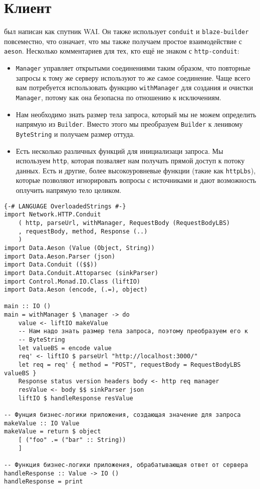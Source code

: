 \section {Клиент}

 был написан как спутник WAI. Он также использует \lstinline!conduit! и \lstinline!blaze-builder! повсеместно, что означает, что мы также получаем простое взаимодействие с \lstinline!aeson!. Несколько комментариев для тех, кто ещё не знаком с \lstinline!http-conduit!:

\begin{itemize}
  \item \lstinline!Manager! управляет открытыми соединениями таким образом, что повторные запросы к тому же серверу используют то же самое соединение. Чаще всего вам потребуется использовать функцию \lstinline!withManager! для создания и очистки \lstinline!Manager!, потому как она безопасна по отношению к исключениям.
  \item Нам необходимо знать размер тела запроса, который мы не можем определить напрямую из \lstinline!Builder!. Вместо этого мы преобразуем \lstinline!Builder! к ленивому \lstinline!ByteString! и получаем размер оттуда.
  \item Есть несколько различных функций для инициализаци запроса. Мы используем \lstinline!http!, которая позваляет нам получать прямой доступ к потоку данных. Есть и другие, более высокоуровневые функции (такие как \lstinline!httpLbs!), которые позволяют игнорировать вопросы с источниками и дают возможность оплучить напрямую тело целиком.
\end{itemize}

\begin{lstlisting}
{-# LANGUAGE OverloadedStrings #-}
import Network.HTTP.Conduit
    ( http, parseUrl, withManager, RequestBody (RequestBodyLBS)
    , requestBody, method, Response (..)
    )
import Data.Aeson (Value (Object, String))
import Data.Aeson.Parser (json)
import Data.Conduit (($$))
import Data.Conduit.Attoparsec (sinkParser)
import Control.Monad.IO.Class (liftIO)
import Data.Aeson (encode, (.=), object)

main :: IO ()
main = withManager $ \manager -> do
    value <- liftIO makeValue
    -- Нам надо знать размер тела запроса, поэтому преобразуем его к
    -- ByteString
    let valueBS = encode value
    req' <- liftIO $ parseUrl "http://localhost:3000/"
    let req = req' { method = "POST", requestBody = RequestBodyLBS valueBS }
    Response status version headers body <- http req manager
    resValue <- body $$ sinkParser json
    liftIO $ handleResponse resValue

-- Фунция бизнес-логики приложения, создающая значение для запроса
makeValue :: IO Value
makeValue = return $ object
    [ ("foo" .= ("bar" :: String))
    ]

-- Функция бизнес-логики приложения, обрабатывающая ответ от сервера
handleResponse :: Value -> IO ()
handleResponse = print
\end{lstlisting}
